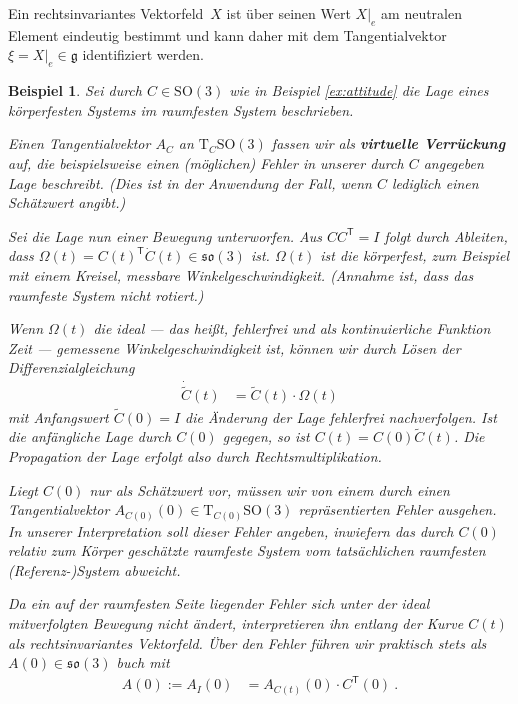 \documentclass[10pt,a4paper]{article}
\theoremstyle{mytheorem}
\theoremstyle{mydefinition}
\newtheorem{example}[theorem]{Beispiel}
\newcommand{\mydef}[1]{\textbf{\textit{#1}}}
\newcommand{\trans}{^\mathsf{T}}
\newcommand{\Tt}{\mathrm{T}}
\newcommand{\SO}{\mathrm{SO}}
\newcommand{\fso}{\mathfrak{so}}
\begin{document}
Ein rechtsinvariantes Vektorfeld~$X$ ist über seinen Wert $X|_e$ am neutralen Element eindeutig bestimmt und kann daher mit dem Tangentialvektor $\xi=X|_e\in\mathfrak{g}$ identifiziert werden.

\begin{example}
\label{ex:attitude_error}
Sei durch $C\in\SO(3)$ wie in Beispiel \ref{ex:attitude} die Lage eines körperfesten Systems im raumfesten System beschrieben.

Einen Tangentialvektor $A_C$ an $\Tt_C\SO(3)$ fassen wir als \mydef{virtuelle Verrückung} auf, die beispielsweise einen (möglichen) Fehler in unserer durch $C$ angegeben Lage beschreibt.
(Dies ist in der Anwendung der Fall, wenn $C$ lediglich einen \emph{Schätzwert} angibt.)

Sei die Lage nun einer Bewegung unterworfen.
Aus $CC\trans=I$ folgt durch Ableiten, dass $\Omega(t)=C(t)\trans\dot{C}(t)\in\fso(3)$ ist.
$\Omega(t)$ ist die körperfest, zum Beispiel mit einem Kreisel, messbare Winkelgeschwindigkeit. (Annahme ist, dass das raumfeste System nicht rotiert.)

Wenn $\Omega(t)$ die ideal --- das heißt, fehlerfrei und als kontinuierliche Funktion Zeit --- gemessene Winkelgeschwindigkeit ist,
können wir durch Lösen der Differenzialgleichung
\begin{align*}
	\dot{\tilde{C}}(t)
	&= \tilde{C}(t)\cdot\Omega(t)
\end{align*}
mit Anfangswert $\tilde{C}(0)=I$ die Änderung der Lage fehlerfrei nachverfolgen.
Ist die anfängliche Lage durch $C(0)$ gegegen, 
so ist $C(t)=C(0)\tilde{C}(t)$.
Die Propagation der Lage erfolgt also durch \emph{Rechtsmultiplikation}.

Liegt $C(0)$ nur als Schätzwert vor, müssen wir von einem durch einen Tangentialvektor $A_{C(0)}(0)\in\Tt_{C(0)}\SO(3)$ repräsentierten Fehler ausgehen.
In unserer \emph{Interpretation} soll dieser Fehler angeben, inwiefern das durch $C(0)$ relativ zum Körper geschätzte \emph{raumfeste} System vom tatsächlichen raumfesten (Referenz-)System abweicht.

Da ein auf der raumfesten Seite liegender Fehler sich unter der ideal mitverfolgten Bewegung nicht ändert, interpretieren ihn entlang der Kurve $C(t)$ als \emph{rechtsinvariantes} Vektorfeld.
Über den Fehler führen wir praktisch stets als $A(0)\in\fso(3)$ buch mit
\begin{align*}
	A(0) := A_I(0) &= A_{C(t)}(0)\cdot C\trans(0)
	\ .
\end{align*}
\end{example}
\end{document}
